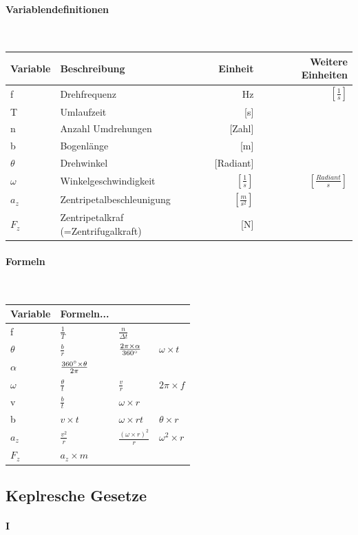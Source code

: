 \documentclass[a4paper,twoside,10pt]{article}
\newcommand{\lbparagraph}[1]{\paragraph{#1}\mbox{}\\}
\begin{document}
\lbparagraph{Variablendefinitionen}

\begin{tabular}{l|l|r|r}
    Variable & Beschreibung & Einheit & Weitere Einheiten \\
    \hline
    f & Drehfrequenz & Hz & $[\frac{1}{s}]$ \\
    T & Umlaufzeit & [s] & \\
    n & Anzahl Umdrehungen & [Zahl] &  \\
    b & Bogenlänge & [m] &  \\
    $\theta$ & Drehwinkel & [Radiant] & \\
    $\omega$ & Winkelgeschwindigkeit & $[\frac{1}{s}]$ & $[\frac{Radiant}{s}]$ \\
    $a_z$ & Zentripetalbeschleunigung & $[\frac{m}{s^2}]$ &  \\
    $F_z$ & Zentripetalkraf (=Zentrifugalkraft) & [N] &
\end{tabular}

\lbparagraph{Formeln}

\begin{tabular}{l|l|l|l}
    Variable & Formeln... & & \\
    \hline
    f & $\frac{1}{T}$ & $\frac{n}{\Delta{t}}$ &  \\
    \hline
    $\theta$ & $\frac{b}{r}$ & $\frac{2\pi \times \alpha}{360\degree}$ & $\omega \times t$ \\
    \hline
    $\alpha$ & $\frac{360\degree \times \theta}{2\pi}$ & & \\
    \hline
    $\omega$ & $\frac{\theta}{t}$ & $\frac{v}{r}$ & $2\pi \times f$ \\
    \hline
    v & $\frac{b}{t}$ & $\omega \times r$ & \\
    \hline
    b & $v \times t$ & $\omega \times rt$ & $\theta \times r$ \\
    \hline
    $a_z$ & $\frac{v^2}{r}$ & $\frac{(\omega \times r)^2}{r}$ & $\omega^2 \times r$ \\
    \hline
    $F_z$ & $a_z \times m$ & &
\end{tabular}

\subsection{Keplresche Gesetze}

\paragraph{I}
\end{document}
